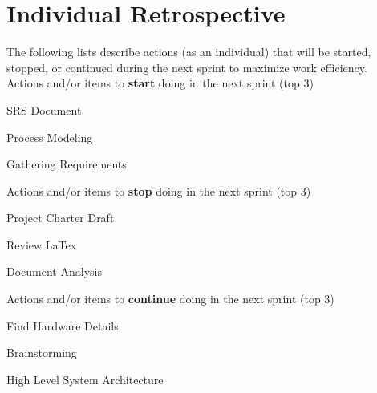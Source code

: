 \documentclass{article}
\begin{document}
\pagebreak

\section{Individual Retrospective}
The following lists describe actions (as an individual) that will be started, stopped, or continued during the next sprint to maximize work efficiency. \\

Actions and/or items to \textbf{start} doing in the next sprint (top 3)
\begin{itemize}
\begin{item}
SRS Document
\end{item}
\begin{item}
Process Modeling
\end{item}
\begin{item}
Gathering Requirements
\end{item}
\end{itemize}

Actions and/or items to \textbf{stop} doing in the next sprint (top 3)
\begin{itemize}
\begin{item}
Project Charter Draft
\end{item}
\begin{item}
Review LaTex
\end{item}
\begin{item}
Document Analysis
\end{item}
\end{itemize}

Actions and/or items to \textbf{continue} doing in the next sprint (top 3)
\begin{itemize}
\begin{item}
Find Hardware Details
\end{item}
\begin{item}
Brainstorming
\end{item}
\begin{item}
High Level System Architecture
\end{item}
\end{itemize}
\end{document}
